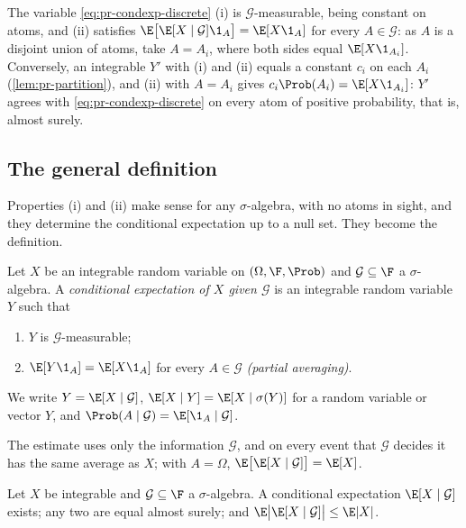 The variable \eqref{eq:pr-condexp-discrete} (i) is $\mathcal G$-measurable, being constant on
atoms, and (ii) satisfies $\E\big[\E[X\mid\mathcal G]\1_A\big]=\E[X\1_A]$ for every
$A\in\mathcal G$: as $A$ is a disjoint union of atoms, take $A=A_i$, where both sides equal
$\E[X\1_{A_i}]$. Conversely, an integrable $Y'$ with (i) and (ii) equals a constant $c_i$ on
each $A_i$ (\cref{lem:pr-partition}), and (ii) with $A=A_i$ gives
$c_i\Prob(A_i)=\E[X\1_{A_i}]$: $Y'$ agrees with \eqref{eq:pr-condexp-discrete} on every atom
of positive probability, that is, almost surely.

\subsection{The general definition}

Properties (i) and (ii) make sense for any $\sigma$-algebra, with no atoms in sight, and
they determine the conditional expectation up to a null set. They become the definition.

\begin{definition}\label{def:pr-condexp}
Let $X$ be an integrable random variable on $(\Omega,\F,\Prob)$ and $\mathcal G\subseteq\F$
a $\sigma$-algebra. A \emph{conditional expectation of $X$ given $\mathcal G$} is an
integrable random variable $Y$ such that
\begin{enumerate}[label=(\roman*)]
  \item $Y$ is $\mathcal G$-measurable;
  \item $\E[Y\1_A]=\E[X\1_A]$ for every $A\in\mathcal G$ \emph{(partial averaging)}.
\end{enumerate}
We write $Y=\E[X\mid\mathcal G]$, $\E[X\mid Y]=\E[X\mid\sigma(Y)]$ for a random variable or
vector $Y$, and $\Prob(A\mid\mathcal G)=\E[\1_A\mid\mathcal G]$.
\end{definition}

The estimate uses only the information $\mathcal G$, and on every event that $\mathcal G$
decides it has the same average as $X$; with $A=\Omega$, $\E\big[\E[X\mid\mathcal G]\big]=\E[X]$.

\begin{theorem}\label{thm:pr-condexp-exists}
Let $X$ be integrable and $\mathcal G\subseteq\F$ a $\sigma$-algebra. A conditional
expectation $\E[X\mid\mathcal G]$ exists; any two are equal almost surely; and
$\E\big|\E[X\mid\mathcal G]\big|\le\E|X|$.
\end{theorem}

